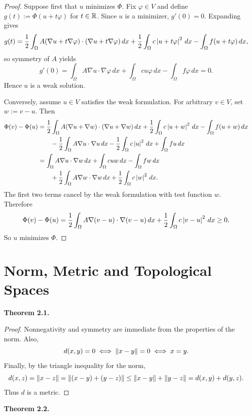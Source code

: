 \documentclass[11pt]{article}
\newenvironment{theoremstmt}[1]{%
  \par\medskip\noindent\textbf{Theorem #1. }\itshape
}{\par\medskip}
\begin{document}
\begin{proof}
Suppose first that $u$ minimizes $\Phi$. Fix $\varphi\in V$ and define $g(t):=\Phi(u+t\varphi)$ for $t\in\mathbb{R}$. Since $u$ is a minimizer, $g'(0)=0$. Expanding gives
\[
g(t)=\frac12\int_{\Omega} A(\nabla u+t\nabla\varphi)\cdot(\nabla u+t\nabla\varphi)\,dx
+\frac12\int_{\Omega} c\left\lvert u+t\varphi\right\rvert^2\,dx
-\int_{\Omega} f(u+t\varphi)\,dx,
\]
so symmetry of $A$ yields
\[
g'(0)=\int_{\Omega} A\nabla u\cdot\nabla\varphi\,dx
+\int_{\Omega} cu\varphi\,dx
-\int_{\Omega} f\varphi\,dx=0.
\]
Hence $u$ is a weak solution.

Conversely, assume $u\in V$ satisfies the weak formulation. For arbitrary $v\in V$, set $w:=v-u$. Then
\begin{align*}
\Phi(v)-\Phi(u)
&=\frac12\int_{\Omega} A(\nabla u+\nabla w)\cdot(\nabla u+\nabla w)\,dx
+\frac12\int_{\Omega} c\left\lvert u+w\right\rvert^2\,dx
-\int_{\Omega} f(u+w)\,dx \\
&\qquad -\frac12\int_{\Omega} A\nabla u\cdot\nabla u\,dx
-\frac12\int_{\Omega} c\left\lvert u\right\rvert^2\,dx
+\int_{\Omega} fu\,dx \\
&=\int_{\Omega} A\nabla u\cdot\nabla w\,dx
+\int_{\Omega} cuw\,dx
-\int_{\Omega} fw\,dx \\
&\qquad +\frac12\int_{\Omega} A\nabla w\cdot\nabla w\,dx
+\frac12\int_{\Omega} c\left\lvert w\right\rvert^2\,dx.
\end{align*}
The first two terms cancel by the weak formulation with test function $w$. Therefore
\[
\Phi(v)-\Phi(u)=\frac12\int_{\Omega} A\nabla(v-u)\cdot\nabla(v-u)\,dx
+\frac12\int_{\Omega} c\left\lvert v-u\right\rvert^2\,dx\ge 0.
\]
So $u$ minimizes $\Phi$.
\end{proof}

\section{Norm, Metric and Topological Spaces}

\begin{theoremstmt}{2.1}
\thmNormInducesMetric
\end{theoremstmt}

\begin{proof}
Nonnegativity and symmetry are immediate from the properties of the norm. Also,
\[
d(x,y)=0 \iff \left\lVert x-y\right\rVert=0 \iff x=y.
\]
Finally, by the triangle inequality for the norm,
\[
d(x,z)=\left\lVert x-z\right\rVert=\left\lVert (x-y)+(y-z)\right\rVert\le \left\lVert x-y\right\rVert+\left\lVert y-z\right\rVert=d(x,y)+d(y,z).
\]
Thus $d$ is a metric.
\end{proof}

\begin{theoremstmt}{2.2}
\thmClosureSequential
\end{theoremstmt}
\end{document}
